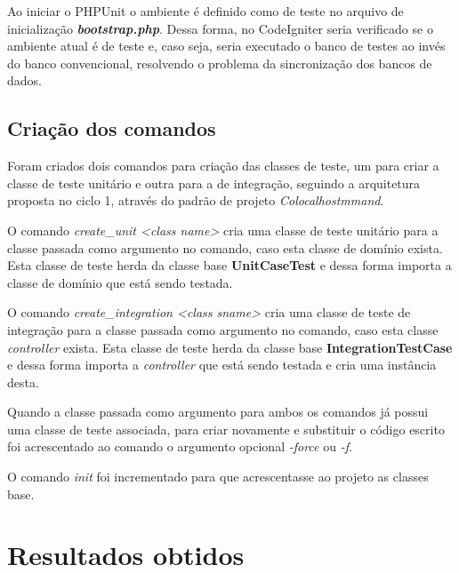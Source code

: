 	    Ao iniciar o PHPUnit o ambiente é definido como de teste no arquivo de inicialização \textit{\textbf{bootstrap.php}}.
	    Dessa forma, no CodeIgniter seria verificado se o ambiente atual é de teste e, caso seja, seria executado o banco de
	    testes ao invés do banco convencional, resolvendo o problema da sincronização dos bancos de dados.

    \subsection{Criação dos comandos}

        Foram criados dois comandos para criação das classes de teste, um para criar a classe de teste unitário e outra para a de integração, seguindo a arquitetura 
        proposta no ciclo 1, através do padrão de projeto \textit{Colocalhostmmand}. 

        O comando \textit{create\_unit <class name>} cria uma classe de teste unitário para a classe passada como argumento no comando, caso esta classe de domínio exista. Esta classe de teste herda da classe base \textbf{UnitCaseTest} e dessa forma importa a classe de domínio que está sendo testada.

        O comando \textit{create\_integration <class sname>} cria uma classe de teste de integração para a classe passada como argumento no comando, caso esta classe \textit{controller} exista. Esta classe de teste herda da classe base \textbf{IntegrationTestCase} e dessa forma importa a \textit{controller} que está sendo testada e cria uma instância desta.

        Quando a classe passada como argumento para ambos os comandos já possui uma classe de teste associada, para criar novamente e substituir o código escrito foi acrescentado ao comando o argumento opcional \textit{-force} ou \textit{-f}.  

        O comando \textit{init} foi incrementado para que acrescentasse ao projeto as classes base.

  \section{Resultados obtidos}
      
